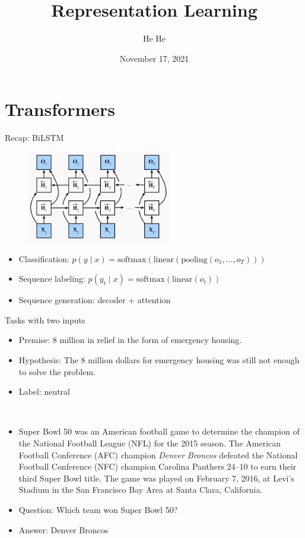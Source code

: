 \documentclass[usenames,dvipsnames,11pt,aspectratio=169]{beamer}
\title[CSCI-GA.2590]{Representation Learning}
\author[He He]{He He
}
\institute[NYU]{New York University}
\date{November 17, 2021}
\begin{document}
\begin{frame}
\titlepage
\end{frame}

\section{Transformers}

\begin{frame}
    {Recap: BiLSTM}
    \begin{figure}
        \includegraphics[height=4cm]{figures/bilstm}
    \end{figure}
    \begin{itemize}
        \item Classification: $p(y\mid x) = \text{softmax}(\text{linear}(\text{pooling}(o_1,\ldots,o_T)))$
        \item Sequence labeling: $p(y_t\mid x) = \text{softmax}(\text{linear}(o_t))$
        \item Sequence generation: decoder + attention
    \end{itemize}
\end{frame}

\begin{frame}
    {Tasks with two inputs}
    \\
    \begin{itemize}
        \item[] Premise: 8 million in relief in the form of emergency housing.
        \item[] Hypothesis: The 8 million dollars for emergency housing was still not enough to solve the problem. 
        \item[] Label: neutral
    \end{itemize}

    \\
    \begin{itemize}
        \item[] 
        {\small
        Super Bowl 50 was an American football game to determine the champion of the National Football League (NFL) for the 2015 season. The American Football Conference (AFC) champion \emph{Denver Broncos} defeated the National Football Conference (NFC) champion Carolina Panthers 24--10 to earn their third Super Bowl title. The game was played on February 7, 2016, at Levi's Stadium in the San Francisco Bay Area at Santa Clara, California.}
\item[] Question: Which team won Super Bowl 50?
\item[] Answer: Denver Broncos 
    \end{itemize}
\end{frame}
\end{document}
